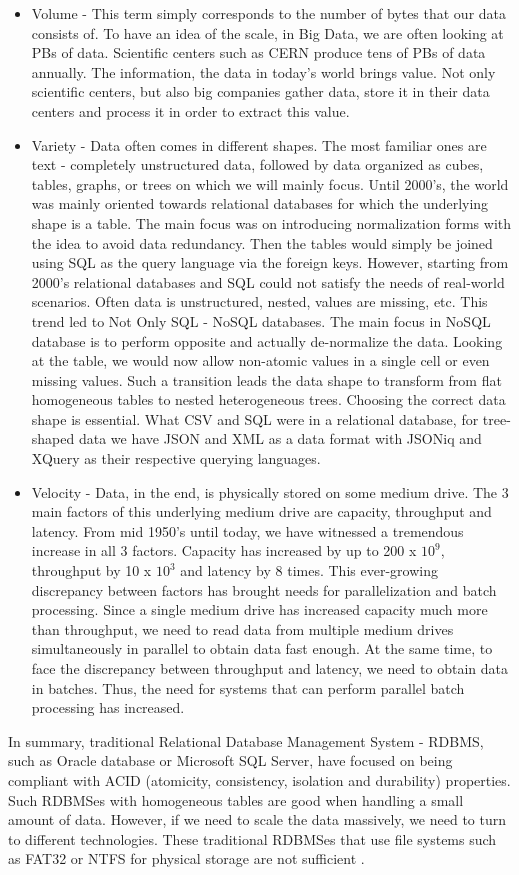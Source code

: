 \begin{itemize}
	\item Volume - This term simply corresponds to the number of bytes that our data consists of. To have an idea of the scale, in Big Data, we are often looking at PBs of data. Scientific centers such as CERN produce tens of PBs of data annually. The information, the data in today's world brings value. Not only scientific centers, but also big companies gather data, store it in their data centers and process it in order to extract this value.
	\item Variety - Data often comes in different shapes. The most familiar ones are text - completely unstructured data, followed by data organized as cubes, tables, graphs, or trees on which we will mainly focus. Until 2000's, the world was mainly oriented towards relational databases for which the underlying shape is a table. The main focus was on introducing normalization forms with the idea to avoid data redundancy. Then the tables would simply be joined using SQL as the query language via the foreign keys. However, starting from 2000's relational databases and SQL could not satisfy the needs of real-world scenarios. Often data is unstructured, nested, values are missing, etc. This trend led to Not Only SQL - NoSQL databases. The main focus in NoSQL database is to perform opposite and actually de-normalize the data. Looking at the table, we would now allow non-atomic values in a single cell or even missing values. Such a transition leads the data shape to transform from flat homogeneous tables to nested heterogeneous trees. Choosing the correct data shape is essential. What CSV and SQL were in a relational database, for tree-shaped data we have JSON and XML as a data format with JSONiq and XQuery as their respective querying languages.
	\item Velocity - Data, in the end, is physically stored on some medium drive. The 3 main factors of this underlying medium drive are capacity, throughput and latency. From mid 1950's until today, we have witnessed a tremendous increase in all 3 factors. Capacity has increased by up to 200 x $10^9$, throughput by 10 x $10^3$  and latency by 8 times. This ever-growing discrepancy between factors has brought needs for parallelization and batch processing. Since a single medium drive has increased capacity much more than throughput, we need to read data from multiple medium drives simultaneously in parallel to obtain data fast enough. At the same time, to face the discrepancy between throughput and latency, we need to obtain data in batches. Thus, the need for systems that can perform parallel batch processing has increased.
\end{itemize}
In summary, traditional Relational Database Management System - RDBMS, such as Oracle database or Microsoft SQL Server, have focused on being compliant with ACID (atomicity, consistency, isolation and durability) properties. Such RDBMSes with homogeneous tables are good when handling a small amount of data. However, if we need to scale the data massively, we need to turn to different technologies. These traditional RDBMSes that use file systems such as FAT32 or NTFS for physical storage are not sufficient \cite{BigDataCourse}. %

